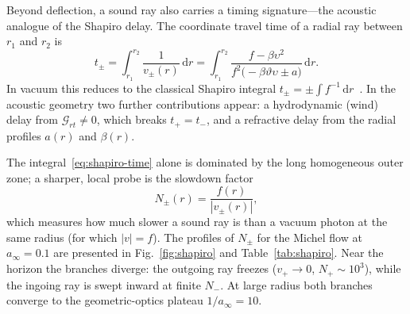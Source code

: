 \documentclass[12pt,a4paper,preprint]{elsarticle}
\begin{document}
            Beyond deflection, a sound ray also carries a timing signature---the acoustic analogue of the Shapiro delay. The coordinate travel time of a radial ray between $r_{1}$ and $r_{2}$ is
            \begin{equation}
                t_{\pm} = \int_{r_{1}}^{r_{2}} \frac{1}{v_{\pm}(r)}\,\mathrm{d}r = \int_{r_{1}}^{r_{2}} \frac{f-\beta\upsilon^{2}}{f^{2}\bigl(-\beta\vartheta\upsilon\pm a\bigr)}\,\mathrm{d}r .
                \label{eq:shapiro-time}
            \end{equation}
            In vacuum this reduces to the classical Shapiro integral $t_{\pm}=\pm\int f^{-1}\,\mathrm{d}r$~\cite{ShapiroII_FourthTestOfGeneralRelativity_1964}. In the acoustic geometry two further contributions appear: a hydrodynamic (wind) delay from $\mathcal{G}_{rt}\neq 0$, which breaks $t_{+}=t_{-}$, and a refractive delay from the radial profiles $a(r)$ and $\beta(r)$.

            The integral~\eqref{eq:shapiro-time} alone is dominated by the long homogeneous outer zone; a sharper, local probe is the slowdown factor
            \begin{equation}
                N_{\pm}(r) = \frac{f(r)}{|v_{\pm}(r)|} ,
                \label{eq:local-slowdown}
            \end{equation}
            which measures how much slower a sound ray is than a vacuum photon at the same radius (for which $|v|=f$). The profiles of $N_{\pm}$ for the Michel flow at $a_{\infty}=0.1$ are presented in Fig.~\ref{fig:shapiro} and Table~\ref{tab:shapiro}. Near the horizon the branches diverge: the outgoing ray freezes ($v_{+}\to 0$, $N_{+}\sim 10^{3}$), while the ingoing ray is swept inward at finite $N_{-}$. At large radius both branches converge to the geometric-optics plateau $1/a_{\infty}=10$.
\end{document}
